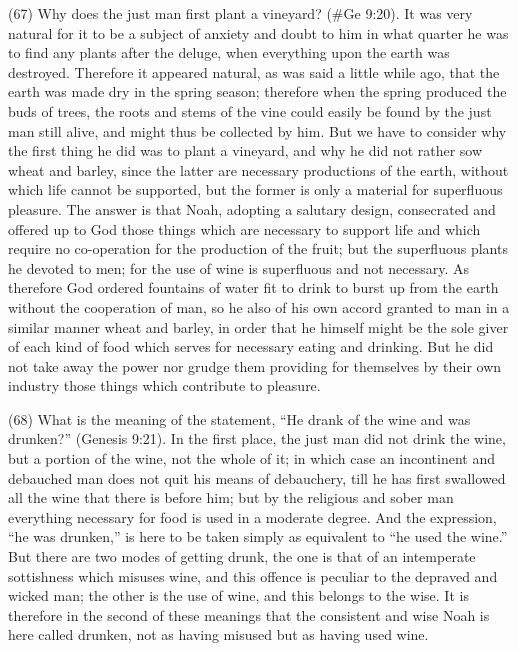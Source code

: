 (67) Why does the just man first plant a vineyard? (\#Ge 9:20). It was very natural for it to be a
subject of anxiety and doubt to him in what quarter he was to find any plants after the deluge, when
everything upon the earth was destroyed. Therefore it appeared natural, as was said a little while
ago, that the earth was made dry in the spring season; therefore when the spring produced the
buds of trees, the roots and stems of the vine could easily be found by the just man still alive, and
might thus be collected by him. But we have to consider why the first thing he did was to plant a
vineyard, and why he did not rather sow wheat and barley, since the latter are necessary
productions of the earth, without which life cannot be supported, but the former is only a material
for superfluous pleasure. The answer is that Noah, adopting a salutary design, consecrated and
offered up to God those things which are necessary to support life and which require no
co-operation for the production of the fruit; but the superfluous plants he devoted to men; for the
use of wine is superfluous and not necessary. As therefore God ordered fountains of water fit to
drink to burst up from the earth without the cooperation of man, so he also of his own accord
granted to man in a similar manner wheat and barley, in order that he himself might be the sole
giver of each kind of food which serves for necessary eating and drinking. But he did not take
away the power nor grudge them providing for themselves by their own industry those things which
contribute to pleasure.

(68) What is the meaning of the statement, ``He drank of the wine and was drunken?'' (Genesis
9:21). In the first place, the just man did not drink the wine, but a portion of the wine, not the whole
of it; in which case an incontinent and debauched man does not quit his means of debauchery, till
he has first swallowed all the wine that there is before him; but by the religious and sober man
everything necessary for food is used in a moderate degree. And the expression, ``he was
drunken,'' is here to be taken simply as equivalent to ``he used the wine.'' But there are two modes
of getting drunk, the one is that of an intemperate sottishness which misuses wine, and this
offence is peculiar to the depraved and wicked man; the other is the use of wine, and this belongs
to the wise. It is therefore in the second of these meanings that the consistent and wise Noah is
here called drunken, not as having misused but as having used wine.


